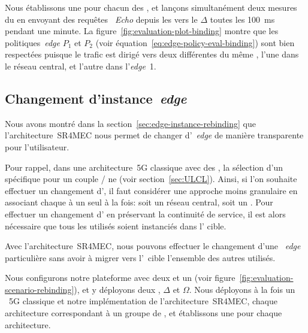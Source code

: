 \documentclass[../main.tex]{subfiles}
\begin{document}
Nous établissons une  pour chacun des , et lançons simultanément deux mesures du  en envoyant des requêtes \textit{~Echo} depuis les  vers le  $\Delta$ toutes les 100~ms pendant une minute.
La figure~\ref{fig:evaluation-plot-binding} montre que les politiques~\textit{edge} $P_1$ et $P_2$ (voir équation~\ref{eq:edge-policy-eval-binding}) sont bien respectées puisque le trafic est dirigé vers deux  différentes du même , l’une dans le réseau central, et l’autre dans l’\textit{edge}~1.

\pagebreak
\subsection{Changement d’instance~\textit{edge}}
Nous avons montré dans la section~\ref{sec:edge-instance-rebinding} que l’architecture~SR4MEC nous permet de changer d’~\textit{edge} de manière transparente pour l’utilisateur.

Pour rappel, dans une architecture~5G classique avec des , la sélection d’un  spécifique pour un couple / ne  (voir section~\ref{sec:ULCL}).
Ainsi, si l’on souhaite effectuer un changement d’, il faut considérer une approche moins granulaire en associant chaque  à un seul  à la fois: soit un réseau central, soit un .
Pour effectuer un changement d’ en préservant la continuité de service, il est alors nécessaire que tous les  utilisés soient instanciés dans l’ cible.

Avec l’architecture~SR4MEC, nous pouvons effectuer le changement d’une ~\textit{edge} particulière sans avoir à migrer vers l’~cible l’ensemble des autres  utilisés.

Nous configurons notre plateforme avec deux  et un  (voir figure~\ref{fig:evaluation-scenario-rebinding}), et y déployons deux , $\Delta$ et $\Omega$.
Nous déployons à la fois un ~5G classique et notre implémentation de l’architecture~SR4MEC, chaque architecture correspondant à un groupe de , et établissons une  pour chaque architecture.
\end{document}
